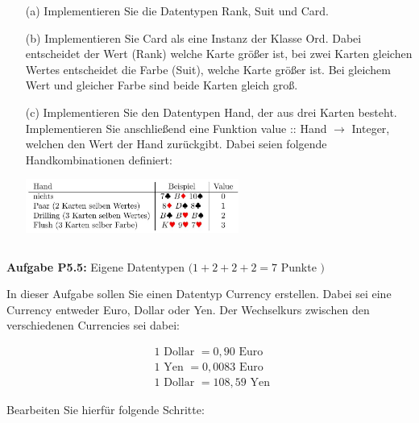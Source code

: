 \begin{itemize}
  \item [(a)] Implementieren Sie die Datentypen Rank, Suit und Card.

\item [(b)] Implementieren Sie Card als eine Instanz der Klasse Ord. Dabei entscheidet der Wert (Rank) welche Karte größer ist, bei zwei Karten gleichen Wertes entscheidet die Farbe (Suit), welche Karte größer ist. Bei gleichem Wert und gleicher Farbe sind beide Karten gleich groß. 

\item [(c)] Implementieren Sie den Datentypen Hand, der aus drei Karten besteht. Implementieren Sie anschließend eine Funktion value :: Hand $\rightarrow$ Integer, welchen den Wert der Hand zurückgibt. Dabei seien folgende Handkombinationen definiert:

\centering
\includegraphics[width=7cm]{2022_11_15_0a5a2eee0aef383b0ce9g-3}

\inputminted{Haskell}{A5_4.hs}
\end{itemize}

\newpage

\textbf{Aufgabe P5.5:} Eigene Datentypen $(1+2+2+2=7$ Punkte $)$ 

In dieser Aufgabe sollen Sie einen Datentyp Currency erstellen. Dabei sei eine Currency entweder Euro, Dollar oder Yen. Der Wechselkurs zwischen den verschiedenen Currencies sei dabei:

$$
\begin{aligned}
&1 \text { Dollar }=0,90 \text { Euro } \\
&1 \text { Yen }=0,0083 \text { Euro } \\
&1 \text { Dollar }=108,59 \text { Yen }
\end{aligned}
$$

Bearbeiten Sie hierfür folgende Schritte:

